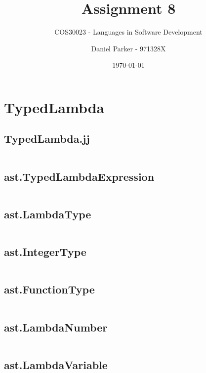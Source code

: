 \documentclass[11pt, numbers=endperiod, parskip=half]{scrartcl}
\title{Assignment 8}
\subtitle{COS30023 - Languages in Software Development}
\author{Daniel Parker - 971328X}
\date{\today}
\begin{document}

\maketitle
\section{TypedLambda}
\subsection{TypedLambda.jj}
\inputminted[tabsize=2]{java}{LambdaTypeSystem/src/TypedLambda.jj}

\subsection{ast.TypedLambdaExpression}
\inputminted[tabsize=2]{java}{LambdaTypeSystem/src/ast/TypedLambdaExpression.java}

\subsection{ast.LambdaType}
\inputminted[tabsize=2]{java}{LambdaTypeSystem/src/ast/LambdaType.java}

\subsection{ast.IntegerType}
\inputminted[tabsize=2]{java}{LambdaTypeSystem/src/ast/IntegerType.java}

\subsection{ast.FunctionType}
\inputminted[tabsize=2]{java}{LambdaTypeSystem/src/ast/FunctionType.java}

\subsection{ast.LambdaNumber}
\inputminted[tabsize=2]{java}{LambdaTypeSystem/src/ast/LambdaNumber.java}

\subsection{ast.LambdaVariable}
\inputminted[tabsize=2]{java}{LambdaTypeSystem/src/ast/LambdaVariable.java}
\end{document}
